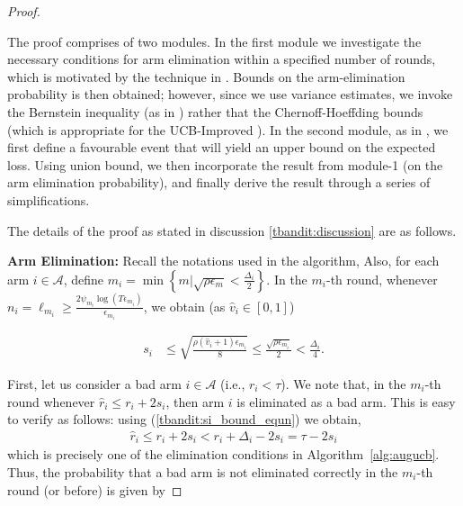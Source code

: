 \begin{proof}
\begin{discussion}
\label{tbandit:discussion}
The proof comprises of two modules. In the first module we investigate the necessary conditions for arm elimination within a specified number of rounds, which is motivated by the technique in \cite{auer2010ucb}. Bounds on the arm-elimination probability is then obtained; however, since we use variance estimates, we invoke the Bernstein inequality (as in \cite{audibert2009exploration}) rather that the Chernoff-Hoeffding bounds (which is appropriate for the UCB-Improved \citep{auer2010ucb}). In the second module, as in \cite{locatelli2016optimal}, we first define a favourable event that will yield an upper bound on the expected loss. Using union bound, we then incorporate the result from module-1 (on the arm elimination probability), and finally derive the result through a series of simplifications.
\end{discussion}
The details of the proof as stated in discussion \ref{tbandit:discussion} are as follows. 


\textbf{Arm Elimination:} Recall the notations used in the algorithm, Also, for each arm $i\in\mathcal{A}$, define $m_{i}=\min\left\lbrace m| \sqrt{\rho\epsilon_{m}}<\frac{\Delta_{i}}{2}\right\rbrace$. In the $m_i$-th round, whenever $n_i=\ell_{m_i}\ge\frac{2\psi_{m_i}\log{(T\epsilon_{m_{i}})}}{\epsilon_{m_{i}}}$, we obtain (as $\hat{v}_i\in[0,1]$)

\begin{align}
\label{tbandit:si_bound_equn}
s_i 
&\le \sqrt{\frac{\rho(\hat{v}_i+1)\epsilon_{m_i}}{8}}
  \le \frac{\sqrt{\rho\epsilon_{m_i}}}{2} < \frac{\Delta_i}{4}.
\end{align}

First, let us consider a bad arm $i\in\mathcal{A}$ (i.e., $r_i<\tau$). We note that, in the $m_i$-th round  whenever 
$\hat{r}_i \le r_i +2s_i$, then arm $i$ is eliminated as a bad arm. This is easy to verify as follows: using (\ref{tbandit:si_bound_equn}) we obtain,
\begin{align*}
\hat{r}_{i}\leq r_{i} + 2s_{i} 
< r_{i} + \Delta_{i} - 2s_{i} 
= \tau - 2s_{i} %
\end{align*}
which is precisely one of the elimination conditions in Algorithm~\ref{alg:augucb}. Thus, the probability that a bad arm is not eliminated correctly in the $m_i$-th round (or before) is given by


\end{proof}

